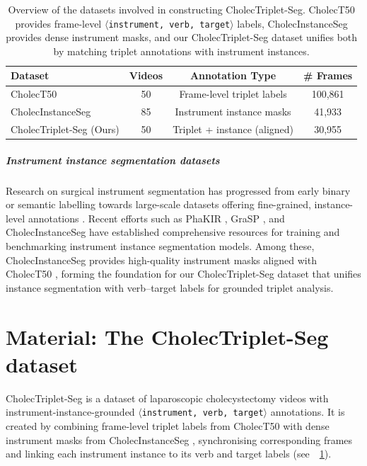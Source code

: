 \documentclass[pdflatex,sn-mathphys-num]{sn-jnl}%
\newcommand{\ivttriplet}{\texttt{$\langle$instrument, verb, target$\rangle$}\xspace}
\newcommand{\tabref}[1]{\tablename~\ref{#1}}
\newcommand{\mysubsection}[1]{\subparagraph{#1}}
\theoremstyle{thmstyleone}%
\theoremstyle{thmstyletwo}%
\theoremstyle{thmstylethree}%
\begin{document}
\begin{table}[t]
\centering
\caption{
Overview of the datasets involved in constructing CholecTriplet-Seg. 
CholecT50 provides frame-level \ivttriplet labels, 
CholecInstanceSeg provides dense instrument masks, and our CholecTriplet-Seg dataset unifies both by matching triplet annotations with instrument instances.
}
\begin{tabular}{l|c|c|c}
\hline
Dataset & Videos & Annotation Type & \# Frames \\
\hline
CholecT50~\cite{nwoye2022rendezvous} & 50 & Frame-level triplet labels  & 100,861 \\
CholecInstanceSeg~\cite{alabi2025cholecinstanceseg} & 85 & Instrument instance masks  & 41,933 \\
CholecTriplet-Seg (Ours) & 50 & Triplet + instance (aligned) & 30,955 \\
\hline
\end{tabular}
\label{tab:dataset_overview}
\end{table}

\mysubsection{Instrument instance segmentation datasets}
Research on surgical instrument segmentation has progressed from early binary or semantic labelling towards large-scale datasets offering fine-grained, instance-level annotations \cite{ahmed2024deep}. Recent efforts such as PhaKIR \cite{rueckert2025comparative}, GraSP \cite{ayobi2024pixelwise}, and CholecInstanceSeg \cite{alabi2025cholecinstanceseg} have established comprehensive resources for training and benchmarking instrument instance segmentation models. 
Among these, CholecInstanceSeg provides high-quality instrument masks aligned with CholecT50 \cite{nwoye2022rendezvous}, forming the foundation for our CholecTriplet-Seg dataset that unifies instance segmentation with verb–target labels for grounded triplet analysis.



\section{Material: The CholecTriplet-Seg dataset}\label{sec::cholectriplet_seg_dataset}
CholecTriplet-Seg is a dataset of laparoscopic cholecystectomy videos with instrument-instance-grounded \ivttriplet annotations. 
It is created by combining frame-level triplet labels from CholecT50 \cite{nwoye2022rendezvous} with dense instrument masks from CholecInstanceSeg \cite{alabi2025cholecinstanceseg}, synchronising corresponding frames and linking each instrument instance to its verb and target labels (see~\tabref{tab:dataset_overview}). 
\end{document}
